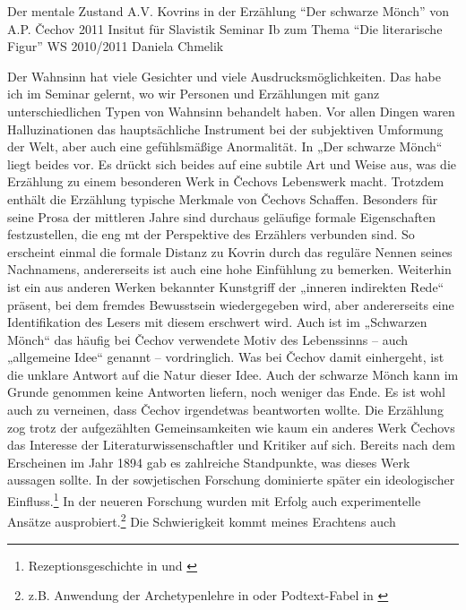 \documentclass{../../sem_paper}
\begin{document}
\titlepg
{Der mentale Zustand A.V. Kovrins in der Erzählung
"`Der schwarze Mönch"' von A.P. Čechov}
{2011}
{Insitut für Slavistik}
{Seminar Ib zum Thema "`Die literarische Figur"'}
{WS 2010/2011}
{Daniela Chmelik}

\tocpaper

Der Wahnsinn hat viele Gesichter und viele Ausdrucksmöglichkeiten. Das habe ich im Seminar
gelernt, wo wir Personen und Erzählungen mit ganz unterschiedlichen Typen von Wahnsinn
behandelt haben. Vor allen Dingen waren Halluzinationen das hauptsächliche Instrument bei der
subjektiven Umformung der Welt, aber auch eine gefühlsmäßige Anormalität. In „Der schwarze
Mönch“ liegt beides vor. Es drückt sich beides auf eine subtile Art und Weise aus, was die
Erzählung zu einem besonderen Werk in Čechovs Lebenswerk macht.
Trotzdem enthält die Erzählung typische Merkmale von Čechovs Schaffen. Besonders für seine
Prosa der mittleren Jahre sind durchaus geläufige formale Eigenschaften festzustellen, die eng mt
der Perspektive des Erzählers verbunden sind. So erscheint einmal die formale Distanz zu Kovrin
durch das reguläre Nennen seines Nachnamens, andererseits ist auch eine hohe Einfühlung zu
bemerken.\autocite[76]{hielscher} Weiterhin ist ein aus anderen Werken bekannter Kunstgriff der „inneren indirekten
Rede“ präsent, bei dem fremdes Bewusstsein wiedergegeben wird, aber andererseits eine
Identifikation des Lesers mit diesem erschwert wird.\autocite[81]{hielscher} Auch ist im „Schwarzen Mönch“ das häufig
bei Čechov verwendete Motiv des Lebenssinns – auch „allgemeine Idee“ genannt – vordringlich.
Was bei Čechov damit einhergeht, ist die unklare Antwort auf die Natur dieser Idee. Auch der
schwarze Mönch kann im Grunde genommen keine Antworten liefern, noch weniger das Ende.\autocite{freise97}\autocite{sonnleitner} Es
ist wohl auch zu verneinen, dass Čechov irgendetwas beantworten wollte.\autocite{winner}
Die Erzählung zog trotz der aufgezählten Gemeinsamkeiten wie kaum ein anderes Werk Čechovs
das Interesse der Literaturwissenschaftler und Kritiker auf sich. Bereits nach dem Erscheinen im
Jahr 1894 gab es zahlreiche Standpunkte, was dieses Werk aussagen sollte. In der sowjetischen
Forschung dominierte später ein ideologischer Einfluss.\footnote{Rezeptionsgeschichte in \autocite{meve} und \autocite{kataev}} In der neueren Forschung wurden mit
Erfolg auch experimentelle Ansätze ausprobiert.\footnote{z.B. Anwendung der Archetypenlehre in \autocite{woern} oder Podtext-Fabel
in \autocite{freise97}
} Die Schwierigkeit kommt meines Erachtens auch
\end{document}
